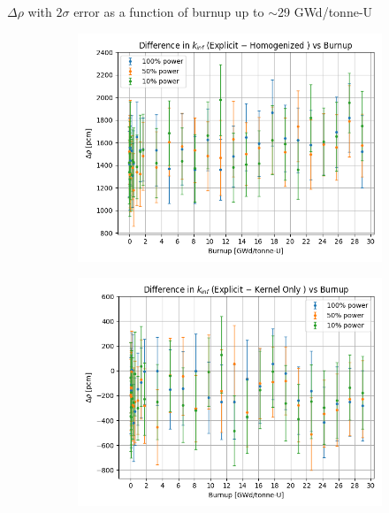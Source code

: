 \documentclass[9pt,t,aspectratio=169]{beamer}
\begin{document}
\begin{frame}{$\Delta \rho$ with $2\sigma$ error as a function of burnup  up to $\sim$29 GWd/tonne-U}
    \begin{figure}
        \centering
        \begin{subfigure}{0.495\linewidth}
            \centering
            \includegraphics[width=\linewidth]{figures/explicit_minus_homog.png}
        \end{subfigure}
        \begin{subfigure}{0.495\linewidth}
            \centering
            \includegraphics[width=\linewidth]{figures/explicit_minus_kern.png}
        \end{subfigure}
        \label{fig:pcm_diffs}
    \end{figure}
\end{frame}
\end{document}
